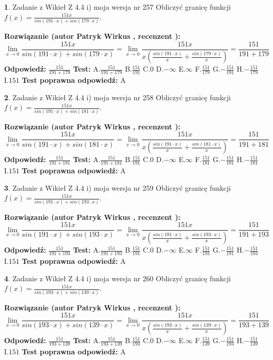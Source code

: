 \documentclass[12pt, a4paper]{article}
\theoremstyle{definition} %
\newtheorem{zad}{}
\newcommand{\zadStart}[1]{\begin{zad}#1\newline}
\newcommand{\zadStop}{\end{zad}}
\newcommand{\rozwStart}[2]{\noindent \textbf{Rozwiązanie (autor #1 , recenzent #2): }\newline}
\newcommand{\rozwStop}{\newline}
\newcommand{\odpStart}{\noindent \textbf{Odpowiedź:}\newline}
\newcommand{\odpStop}{\newline}
\newcommand{\testStart}{\noindent \textbf{Test:}\newline}
\newcommand{\testStop}{\newline}
\newcommand{\kluczStart}{\noindent \textbf{Test poprawna odpowiedź:}\newline}
\newcommand{\kluczStop}{\newline}
\begin{document}
\zadStart{Zadanie z Wikieł Z 4.4 i) moja wersja nr 257}
Obliczyć granicę funkcji $f(x)=\frac{151x}{sin(191\cdot x) +sin(179\cdot x)}$.
\zadStop
\rozwStart{Patryk Wirkus}{}
$$\lim\limits_{x\to 0}\frac{151x}{sin(191\cdot x) +sin(179\cdot x)}=\lim\limits_{x\to 0}\frac{151x}{x(\frac{sin(191\cdot x)}{x}+\frac{sin(179\cdot x)}{x})}=\frac{151}{191+179}$$
\rozwStop
\odpStart
$\frac{151}{191+179}$
\odpStop
\testStart
A.$\frac{151}{191+179}$
B.$\frac{151}{191}$
C.$0$
D.$-\infty$
E.$\infty$
F.$\frac{151}{179}$
G.$-\frac{151}{191}$
H.$-\frac{151}{179}$
I.$151$
\testStop
\kluczStart
A
\kluczStop



\zadStart{Zadanie z Wikieł Z 4.4 i) moja wersja nr 258}
Obliczyć granicę funkcji $f(x)=\frac{151x}{sin(191\cdot x) +sin(181\cdot x)}$.
\zadStop
\rozwStart{Patryk Wirkus}{}
$$\lim\limits_{x\to 0}\frac{151x}{sin(191\cdot x) +sin(181\cdot x)}=\lim\limits_{x\to 0}\frac{151x}{x(\frac{sin(191\cdot x)}{x}+\frac{sin(181\cdot x)}{x})}=\frac{151}{191+181}$$
\rozwStop
\odpStart
$\frac{151}{191+181}$
\odpStop
\testStart
A.$\frac{151}{191+181}$
B.$\frac{151}{191}$
C.$0$
D.$-\infty$
E.$\infty$
F.$\frac{151}{181}$
G.$-\frac{151}{191}$
H.$-\frac{151}{181}$
I.$151$
\testStop
\kluczStart
A
\kluczStop



\zadStart{Zadanie z Wikieł Z 4.4 i) moja wersja nr 259}
Obliczyć granicę funkcji $f(x)=\frac{151x}{sin(191\cdot x) +sin(193\cdot x)}$.
\zadStop
\rozwStart{Patryk Wirkus}{}
$$\lim\limits_{x\to 0}\frac{151x}{sin(191\cdot x) +sin(193\cdot x)}=\lim\limits_{x\to 0}\frac{151x}{x(\frac{sin(191\cdot x)}{x}+\frac{sin(193\cdot x)}{x})}=\frac{151}{191+193}$$
\rozwStop
\odpStart
$\frac{151}{191+193}$
\odpStop
\testStart
A.$\frac{151}{191+193}$
B.$\frac{151}{191}$
C.$0$
D.$-\infty$
E.$\infty$
F.$\frac{151}{193}$
G.$-\frac{151}{191}$
H.$-\frac{151}{193}$
I.$151$
\testStop
\kluczStart
A
\kluczStop



\zadStart{Zadanie z Wikieł Z 4.4 i) moja wersja nr 260}
Obliczyć granicę funkcji $f(x)=\frac{151x}{sin(193\cdot x) +sin(139\cdot x)}$.
\zadStop
\rozwStart{Patryk Wirkus}{}
$$\lim\limits_{x\to 0}\frac{151x}{sin(193\cdot x) +sin(139\cdot x)}=\lim\limits_{x\to 0}\frac{151x}{x(\frac{sin(193\cdot x)}{x}+\frac{sin(139\cdot x)}{x})}=\frac{151}{193+139}$$
\rozwStop
\odpStart
$\frac{151}{193+139}$
\odpStop
\testStart
A.$\frac{151}{193+139}$
B.$\frac{151}{193}$
C.$0$
D.$-\infty$
E.$\infty$
F.$\frac{151}{139}$
G.$-\frac{151}{193}$
H.$-\frac{151}{139}$
I.$151$
\testStop
\kluczStart
A
\kluczStop
\end{document}
